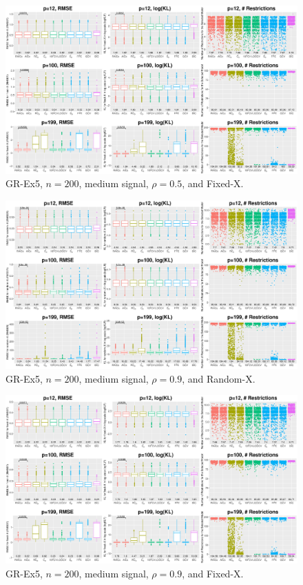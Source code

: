 \begin{figure}[!ht]
\centering
\includegraphics[width=\textwidth]{figures/supplement/fixedx_GR-Ex5_n200_msnr_rho05.eps}
\caption{GR-Ex5, $n=200$, medium signal, $\rho=0.5$, and Fixed-X.}
\end{figure}
\clearpage
\begin{figure}[!ht]
\centering
\includegraphics[width=\textwidth]{figures/supplement/randomx_GR-Ex5_n200_msnr_rho09.eps}
\caption{GR-Ex5, $n=200$, medium signal, $\rho=0.9$, and Random-X.}
\end{figure}
\begin{figure}[!ht]
\centering
\includegraphics[width=\textwidth]{figures/supplement/fixedx_GR-Ex5_n200_msnr_rho09.eps}
\caption{GR-Ex5, $n=200$, medium signal, $\rho=0.9$, and Fixed-X.}
\end{figure}

